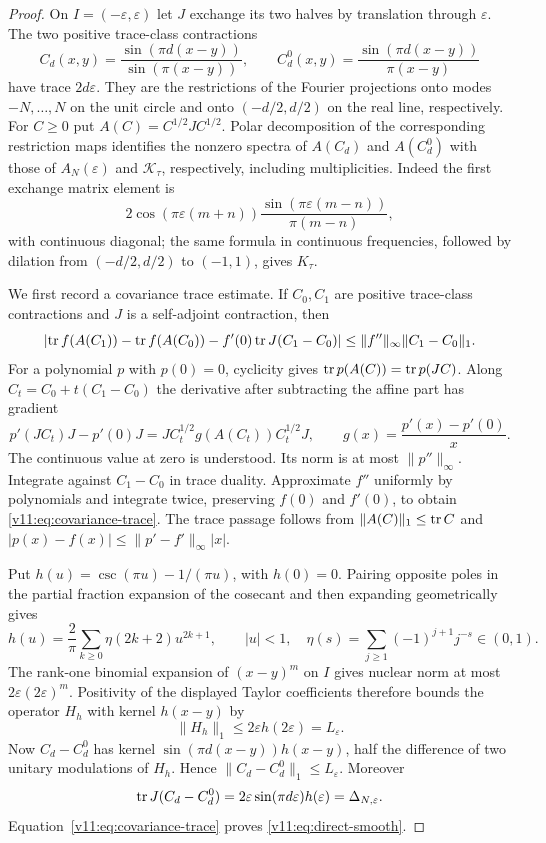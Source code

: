 \begin{proof}
On $I=(-\varepsilon,\varepsilon)$ let $J$ exchange its two halves by
translation through $\varepsilon$.  The two positive trace-class
contractions
\[
 C_d(x,y)=\frac{\sin(\pi d(x-y))}{\sin(\pi(x-y))},\qquad
 C_d^0(x,y)=\frac{\sin(\pi d(x-y))}{\pi(x-y)}
\]
have trace $2d\varepsilon$.  They are the restrictions of the Fourier
projections onto modes $-N,\ldots,N$ on the unit circle and onto
$(-d/2,d/2)$ on the real line, respectively.  For $C\ge0$ put
$A(C)=C^{1/2}JC^{1/2}$.  Polar decomposition of the corresponding
restriction maps identifies the nonzero spectra of $A(C_d)$ and
$A(C_d^0)$ with those of $A_N(\varepsilon)$ and $\mathcal K_\tau$,
respectively, including multiplicities.  Indeed the first exchange
matrix element is
\[
 2\cos(\pi\varepsilon(m+n))
       \frac{\sin(\pi\varepsilon(m-n))}{\pi(m-n)},
\]
with continuous diagonal; the same formula in continuous frequencies,
followed by dilation from $(-d/2,d/2)$ to $(-1,1)$, gives $K_\tau$.

We first record a covariance trace estimate.  If $C_0,C_1$ are positive
trace-class contractions and $J$ is a self-adjoint contraction, then
\begin{equation}\label{v11:eq:covariance-trace}
 \left|\operatorname{tr} f(A(C_1))-\operatorname{tr} f(A(C_0))
       -f'(0)\operatorname{tr} J(C_1-C_0)\right|
 \le\|f''\|_\infty\|C_1-C_0\|_1.
\end{equation}
For a polynomial $p$ with $p(0)=0$, cyclicity gives
$\operatorname{tr} p(A(C))=\operatorname{tr} p(JC)$.  Along $C_t=C_0+t(C_1-C_0)$ the derivative
after subtracting the affine part has gradient
\[
 p'(JC_t)J-p'(0)J
 =JC_t^{1/2}g(A(C_t))C_t^{1/2}J,
 \qquad g(x)=\frac{p'(x)-p'(0)}x.
\]
The continuous value at zero is understood.  Its norm is at most
$\|p''\|_\infty$.  Integrate against $C_1-C_0$ in trace duality.
Approximate $f''$ uniformly by polynomials and integrate twice,
preserving $f(0)$ and $f'(0)$, to obtain
\eqref{v11:eq:covariance-trace}.  The trace passage follows from
$\|A(C)\|_1\le\operatorname{tr} C$ and $|p(x)-f(x)|\le
\|p'-f'\|_\infty|x|$.

Put $h(u)=\csc(\pi u)-1/(\pi u)$, with $h(0)=0$.
Pairing opposite poles in the partial fraction expansion of the
cosecant and then expanding geometrically gives
\[
 h(u)=\frac2\pi\sum_{k\ge0}\eta(2k+2)u^{2k+1},\qquad |u|<1,
 \quad \eta(s)=\sum_{j\ge1}(-1)^{j+1}j^{-s}\in(0,1).
\]
The rank-one binomial expansion of $(x-y)^m$ on $I$ gives nuclear norm
at most $2\varepsilon(2\varepsilon)^m$.  Positivity of the displayed
Taylor coefficients therefore bounds the operator $H_h$ with kernel
$h(x-y)$ by
\[
 \|H_h\|_1\le2\varepsilon h(2\varepsilon)=L_\varepsilon.
\]
Now $C_d-C_d^0$ has kernel $\sin(\pi d(x-y))h(x-y)$, half the
difference of two unitary modulations of $H_h$.  Hence
$\|C_d-C_d^0\|_1\le L_\varepsilon$.  Moreover
\[
 \operatorname{tr} J(C_d-C_d^0)=2\varepsilon\sin(\pi d\varepsilon)h(\varepsilon)
                 =\Delta_{N,\varepsilon}.
\]
Equation~\eqref{v11:eq:covariance-trace} proves
\eqref{v11:eq:direct-smooth}.


\end{proof}
